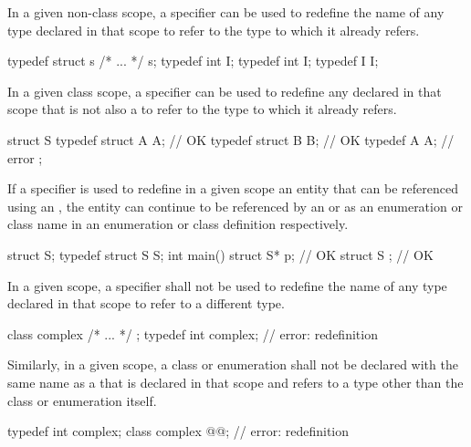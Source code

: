 \pnum
{}%
In a given non-class scope, a  specifier can be used to
redefine the name of any type declared in that scope to refer to the
type to which it already refers.
\begin{example}

\begin{codeblock}
typedef struct s { /* ... */ } s;
typedef int I;
typedef int I;
typedef I I;
\end{codeblock}
\end{example}

\pnum
In a given class scope, a  specifier can be used to
redefine any  declared in that scope that is not
also a  to refer to the type to which it already
refers.
\begin{example}

\begin{codeblock}
struct S {
  typedef struct A { } A;       // OK
  typedef struct B B;           // OK
  typedef A A;                  // error
};
\end{codeblock}
\end{example}

\pnum
If a  specifier is used to redefine in a given scope an
entity that can be referenced using an ,
the entity can continue to be referenced by an
 or as an enumeration or class name
in an enumeration or class definition respectively. \begin{example}
\begin{codeblock}
struct S;
typedef struct S S;
int main() {
  struct S* p;                  // OK
}
struct S { };                   // OK
\end{codeblock}
\end{example}

\pnum
In a given scope, a  specifier shall not be used to
redefine the name of any type declared in that scope to refer to a
different type.
\begin{example}

\begin{codeblock}
class complex { /* ... */ };
typedef int complex;            // error: redefinition
\end{codeblock}
\end{example}

\pnum
Similarly, in a given scope, a class or enumeration shall not be
declared with the same name as a  that is
declared in that scope and refers to a type other than the class or
enumeration itself.
\begin{example}

\begin{codeblock}
typedef int complex;
class complex @@;   // error: redefinition
\end{codeblock}
\end{example}

